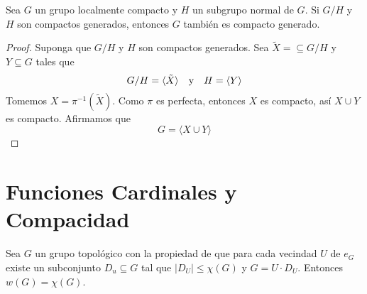 \documentclass[12pt]{report}
\theoremstyle{largebreak}
\newcommand\abs[1]{\ensuremath{\left|#1\right|}}
\newcommand{\gen}[1]{\ensuremath{\langle#1\rangle}}
\begin{document}
    \begin{theor}
        Sea $G$ un grupo localmente compacto y $H$ un subgrupo normal de $G$. Si $G/H$ y $H$ son compactos generados, entonces $G$ también es compacto generado.
    \end{theor}

    \begin{proof}
        Suponga que $G/H$ y $H$ son compactos generados. Sea $\tilde{X}=\subseteq G/H$ y $Y\subseteq G$ tales que
        \begin{equation*}
            G/H=\gen{\tilde{X}}\quad\textup{y}\quad H=\gen{Y}
        \end{equation*}
        Tomemos $X=\pi^{-1}(\tilde{X})$. Como $\pi$ es perfecta, entonces $X$ es compacto, así $X\cup Y$ es compacto. Afirmamos que
        \begin{equation*}
            G=\gen{X\cup Y}
        \end{equation*}
    \end{proof}

    \section{Funciones Cardinales y Compacidad}

    \begin{theor}
            Sea $G$ un grupo topológico con la propiedad de que para cada vecindad $U$ de $e_G$ existe un subconjunto $D_u\subseteq G$ tal que $\abs{D_U}\leq\chi(G)$ y $G=U\cdot D_U$. Entonces $w(G)=\chi(G)$.
    \end{theor}
\end{document}
